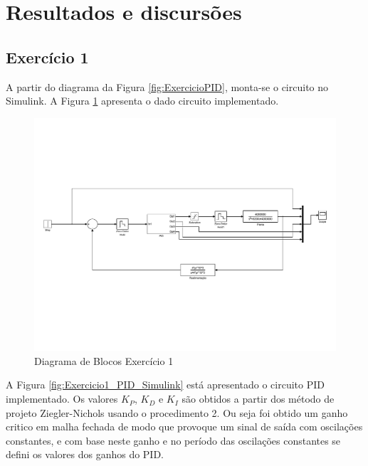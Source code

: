 \section{Resultados e discursões}

\subsection{Exercício 1}
	A partir do diagrama da Figura \ref{fig:ExercicioPID}, monta-se o circuito no Simulink\textregistered. A Figura \ref{fig:Exercicio1_PID_SimulinkII} apresenta o dado circuito implementado.

	\begin{figure}[H]
		\centering
		\includegraphics[scale = .4]{Imagens/Exercicio1_PID_SimulinkII.pdf}
		\caption{Diagrama de Blocos Exercício 1}
		\label{fig:Exercicio1_PID_SimulinkII}
	\end{figure}
	
	 A Figura \ref{fig:Exercicio1_PID_Simulink} está apresentado o circuito PID implementado. Os valores $K_P$, $K_D$ e $K_I$ são obtidos a partir dos método de projeto Ziegler-Nichols usando o procedimento 2. Ou seja foi obtido um ganho critico em malha fechada de modo que provoque um sinal de saída com oscilações constantes, e com base neste ganho e no período das oscilações constantes se defini os valores dos ganhos do PID.
	
